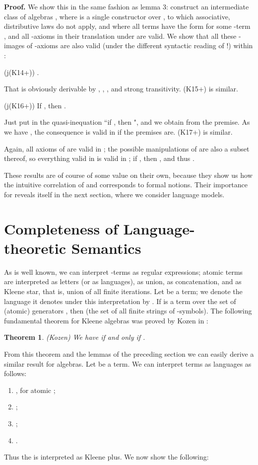 \documentclass{eptcs}
\newtheorem{thm}[defn]{Theorem}
\newcommand{\proofbeg}{\textbf{Proof. }}
\newcommand{\proofend}{\hfill }
\begin{document}
\proofbeg
We show this in the same fashion as lemma 3: construct an
intermediate class of algebras , where  is a single constructor over
, to which associative, distributive laws do not apply, and
where all terms
have the form  for some -term , and all -axioms 
in their translation under 
are valid. We show that all these -images of -axioms 
are also valid (under the different syntactic reading
of !) within : 

(j(K14+)) . 

That is obviously derivable by , , ,
and strong transitivity.
(K15+) is similar. 

(j(K16+)) If , then . 

Just put  in the quasi-inequation 
``if , then ", and
we obtain  from the premise. As we have 
, the consequence is valid in  if the
premises are.
(K17+) is similar.

Again, all axioms of 
are valid in ; the possible manipulations of  are
also a subset thereof, so everything valid in  is valid in ;
if , then , and thus .
\proofend

These results are of course of some value on their own, because they
show us how the intuitive correlation of  and  corresponds 
to formal notions. Their importance for  reveals itself in the
next section, where we consider language models.



\section{Completeness of Language-theoretic Semantics}

As is well known, we can interpret -terms as regular
expressions; atomic terms are interpreted as letters (or as 
languages),
 as union,  as concatenation, and  as Kleene
star, that is, union of all finite iterations. Let  be
a  term; we denote the language it denotes under this
interpretation by .
If  is a term over the set of (atomic) generators , 
then  (the set of all finite strings of
-symbols). The following 
fundamental theorem for Kleene algebras was proved by 
Kozen in \cite{kozen:completeness}:

\begin{thm}
(Kozen)
We have  if and only if .
\end{thm}

From this theorem and the lemmas of the preceding section we can easily
derive a similar result for  algebras. Let  be a 
term. We can interpret  terms as languages as follows:
\begin{enumerate}
\item , for atomic ;
\item ;
\item ;
\item .
\end{enumerate}
Thus the  is interpreted as Kleene plus. We now show the following:
\end{document}
